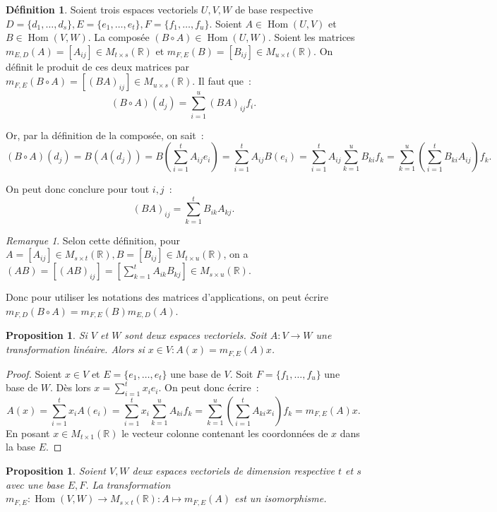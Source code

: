 \documentclass{article}
\DeclareMathOperator{\Hom}{Hom}
\newcommand{\R}{\mathbb R}
\newcommand{\M}[3]{M_{#1 \times #2}(#3)}
\newtheorem{prp}[thm]{Proposition}
\theoremstyle{definition}
\newtheorem{déf}[thm]{Définition}
\theoremstyle{remark}
\newtheorem*{rmq}{Remarque}
\begin{document}
		\begin{déf} Soient trois espaces vectoriels $U, V, W$ de base respective $D = \{d_1, \dotsc, d_s\}, E = \{e_1, \dotsc, e_t\}, F = \{f_1, \dotsc, f_u\}$.
		Soient $A \in \Hom(U, V)$ et $B \in \Hom(V, W)$. La composée $(B \circ A) \in \Hom(U, W)$. Soient les matrices $m_{E, D}(A) = [A_{ij}] \in \M ts\R$ et
		$m_{F, E}(B) = [B_{ij}] \in \M ut\R$. On définit le produit de ces deux matrices par $m_{F, E}(B \circ A) = [(BA)_{ij}] \in \M us\R$. Il faut que~:
		\[(B \circ A)(d_j) = \sum_{i=1}^u(BA)_{ij}f_i. \]

		Or, par la définition de la composée, on sait~:
		\[(B \circ A)(d_j) = B(A(d_j)) = B\left(\sum_{i=1}^tA_{ij}e_i\right) = \sum_{i=1}^tA_{ij}B(e_i)
		                   = \sum_{i=1}^tA_{ij}\sum_{k=1}^uB_{ki}f_k = \sum_{k=1}^u\left(\sum_{i=1}^tB_{ki}A_{ij}\right)f_k.\]

		On peut donc conclure pour tout $i, j$~: \[(BA)_{ij} = \sum_{k=1}^tB_{ik}A_{kj}.\] \end{déf}

		\begin{rmq} Selon cette définition, pour $A = [A_{ij}] \in \M st\R, B = [B_{ij}] \in \M tu\R$, on a
		$(AB) = [(AB)_{ij}] = \left[\sum_{k=1}^tA_{ik}B_{kj}\right] \in \M su\R$.

		Donc pour utiliser les notations des matrices d'applications, on peut écrire $m_{F, D}(B \circ A) = m_{F, E}(B)m_{E, D}(A)$. \end{rmq}

		\begin{prp} Si $V$ et $W$ sont deux espaces vectoriels. Soit $A : V \to W$ une transformation linéaire. Alors si $x \in V : A(x) = m_{F, E}(A)x$. \end{prp}

		\begin{proof} Soient $x \in V$ et $E = \{e_1, \dotsc, e_t\}$ une base de $V$. Soit $F = \{f_1, \dotsc, f_u\}$ une base de $W$. Dès lors
		$x = \sum_{i=1}^tx_ie_i$. On peut donc écrire~:
		\[A(x) = \sum_{i=1}^tx_iA(e_i) = \sum_{i=1}^tx_i\sum_{k=1}^uA_{ki}f_k = \sum_{k=1}^u\left(\sum_{i=1}^tA_{ki}x_i\right)f_k = m_{F, E}(A)x.\]
		En posant $x \in \M t1\R$ le vecteur colonne contenant les coordonnées de $x$ dans la base $E$. \end{proof}

		\begin{prp} Soient $V, W$ deux espaces vectoriels de dimension respective $t$ et $s$ avec une base $E, F$. La transformation
		$m_{F, E} : \Hom(V, W) \to \M st\R : A \mapsto m_{F, E}(A)$ est un isomorphisme. \end{prp}
\end{document}
